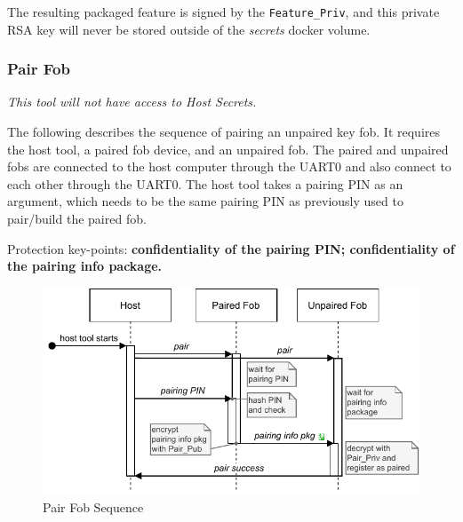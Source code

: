 \documentclass[11pt,oneside,onecolumn,letterpaper]{article}
\begin{document}
The resulting packaged feature is signed by the \verb|Feature_Priv|, and this private RSA key will never be stored outside of the \textit{secrets} docker volume.

\subsubsection{Pair Fob}

\textit{This tool will not have access to Host Secrets.}

The following describes the sequence of pairing an unpaired key fob. It requires the host tool, a paired fob device, and an unpaired fob. The paired and unpaired fobs are connected to the host computer through the UART0 and also connect to each other through the UART0. The host tool takes a pairing PIN as an argument, which needs to be the same pairing PIN as previously used to pair/build the paired fob.

Protection key-points: \textbf{confidentiality of the pairing PIN; confidentiality of the pairing info package.}

\begin{figure}[!htbp]
	\begin{centering}
		\includegraphics[width = .6\textwidth]{pic/pair.pdf}
		\caption{Pair Fob Sequence}
		\label{fig:pair}
	\end{centering}
\end{figure}
\end{document}
